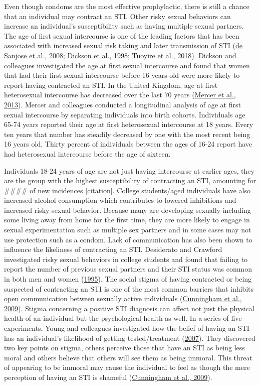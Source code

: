 \documentclass[
  donotrepeattitle,doc, 12pt, a4paper,floatsintext]{apa7}
\begin{document}
Even though condoms are the most effective prophylactic, there is still a chance that an individual may contract an STI. Other risky sexual behaviors can increase an individual's susceptibility such as having multiple sexual partners. The age of first sexual intercourse is one of the leading factors that has been associated with increased sexual risk taking and later transmission of STI (\protect\hyperlink{ref-desanjose2008}{de Sanjose et al., 2008}; \protect\hyperlink{ref-dickson1998}{Dickson et al., 1998}; \protect\hyperlink{ref-tuoyire2018}{Tuoyire et al., 2018}). Dickson and colleagues investigated the age at first sexual intercourse and found that women that had their first sexual intercourse before 16 years-old were more likely to report having contracted an STI. In the United Kingdom, age at first heterosexual intercourse has decreased over the last 70 years (\protect\hyperlink{ref-mercer2013}{Mercer et al., 2013}). Mercer and colleagues conducted a longitudinal analysis of age at first sexual intercourse by separating individuals into birth cohorts. Individuals age 65-74 years reported their age at first heterosexual intercourse at 18 years. Every ten years that number has steadily decreased by one with the most recent being 16 years old. Thirty percent of individuals between the ages of 16-24 report have had heterosexual intercourse before the age of sixteen.

Individuals 18-24 years of age are not just having intercourse at earlier ages, they are the group with the highest susceptibility of contracting an STI, amounting for \#\#\#\# of new incidences {[}citation{]}. College students/aged individuals have also increased alcohol consumption which contributes to lowered inhibitions and increased risky sexual behavior. Because many are developing sexually including some living away from home for the first time, they are more likely to engage in sexual experimentation such as multiple sex partners and in some cases may not use protection such as a condom.
Lack of communication has also been shown to influence the likeliness of contracting an STI. Desiderato and Crawford investigated risky sexual behaviors in college students and found that failing to report the number of previous sexual partners and their STI status was common in both men and women (\protect\hyperlink{ref-desiderato1995}{1995}). The social stigma of having contracted or being suspected of contracting an STI is one of the most common barriers that inhibits open communication between sexually active individuals (\protect\hyperlink{ref-cunningham2009}{Cunningham et al., 2009}). Stigma concerning a positive STI diagnosis can affect not just the physical health of an individual but the psychological health as well. In a series of five experiments, Young and colleagues investigated how the belief of having an STI has an individual's likelihood of getting tested/treatment (\protect\hyperlink{ref-young2007}{2007}). They discovered two key points on stigma, others perceive those that have an STI as being less moral and others believe that others will see them as being immoral. This threat of appearing to be immoral may cause the individual to feel as though the mere perception of having an STI is shameful (\protect\hyperlink{ref-cunningham2009}{Cunningham et al., 2009}).
\end{document}
